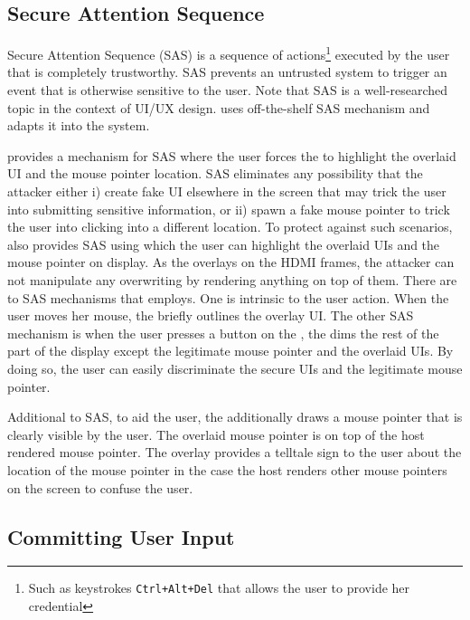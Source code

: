 \subsection{Secure Attention Sequence}
\label{sec:systemDesign:SAS}

Secure Attention Sequence (SAS) is a sequence of actions\footnote{Such as keystrokes \texttt{Ctrl+Alt+Del} that allows the user to provide her credential} executed by the user that is completely trustworthy. SAS prevents an untrusted system to trigger an event that is otherwise sensitive to the user. Note that SAS is a well-researched topic in the context of UI/UX design. \name uses off-the-shelf SAS mechanism and adapts it into the system. 

\name provides a mechanism for SAS where the user forces the \device to highlight the overlaid UI and the mouse pointer location. SAS eliminates any possibility that the attacker either i) create fake UI elsewhere in the screen that may trick the user into submitting sensitive information, or ii) spawn a fake mouse pointer to trick the user into clicking into a different location. To protect against such scenarios, \device also provides SAS using which the user can highlight the overlaid UIs and the mouse pointer on display. As the \device overlays on the HDMI frames, the attacker can not manipulate any overwriting by rendering anything on top of them. 
There are to SAS mechanisms that \name employs. One is intrinsic to the user action. When the user moves her mouse, the \device briefly outlines the overlay UI. The other SAS mechanism is when the user presses a button on the \device, the \device dims the rest of the part of the display except the legitimate mouse pointer and the overlaid UIs. By doing so, the user can easily discriminate the secure UIs and the legitimate mouse pointer.

 Additional to SAS, to aid the user, the \device additionally draws a mouse pointer that is clearly visible by the user. The overlaid mouse pointer is on top of the host rendered mouse pointer. The overlay provides a telltale sign to the user about the location of the mouse pointer in the case the host renders other mouse pointers on the screen to confuse the user.  
 

\subsection{Committing User Input}
\label{sec:systemDesign:commit}

